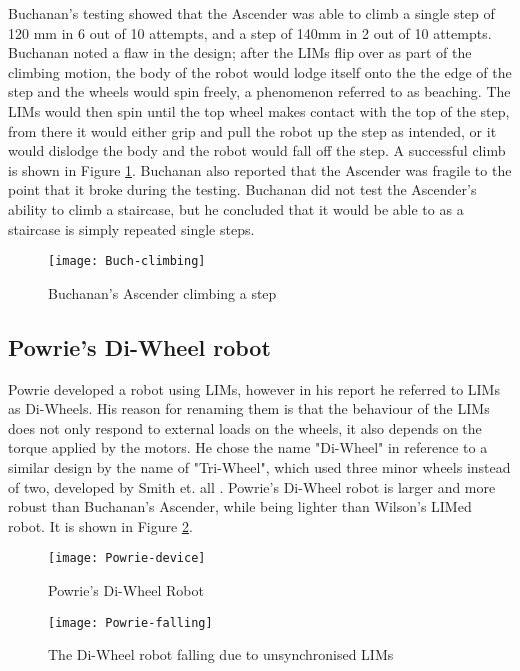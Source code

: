 Buchanan's testing showed that the Ascender was able to climb a single step of 120 mm in 6 out of 10 attempts, and a step of 140mm in 2 out of 10 attempts. Buchanan noted a flaw in the design; after the LIMs flip over as part of the climbing motion, the body of the robot would lodge itself onto the the edge of the step and the wheels would spin freely, a phenomenon referred to as beaching. The LIMs would then spin until the top wheel makes contact with the top of the step, from there it would either grip and pull the robot up the step as intended, or it would dislodge the body and the robot would fall off the step. A successful climb is shown in Figure \ref{Buch climbing}.  Buchanan also reported that the Ascender was fragile to the point that it broke during the testing. Buchanan did not test the Ascender's ability to climb a staircase, but he concluded that it would be able to as a staircase is simply repeated single steps.
\newpage
\begin{figure}[h]
	\centering
	\texttt{[image: Buch-climbing]}
	\caption{Buchanan's Ascender climbing a step \citep{Buchanan-2018}}
	\label{Buch climbing}
\end{figure}

\newpage
\subsection{Powrie's Di-Wheel robot}

Powrie developed a robot using LIMs, however in his report he referred to LIMs as Di-Wheels. His reason for renaming them is that the behaviour of the LIMs does not only respond to external loads on the wheels, it also depends on the torque applied by the motors. He chose the name "Di-Wheel" in reference to a similar design by the name of "Tri-Wheel", which used three minor wheels instead of two, developed by Smith et. all \citep{Smith-2015}. Powrie's Di-Wheel robot is larger and more robust than Buchanan's Ascender, while being lighter than Wilson's LIMed robot. It is shown in Figure \ref{Powrie robot}.\\

\begin{figure}[h]
	\centering
	\texttt{[image: Powrie-device]}
	\caption{Powrie's Di-Wheel Robot \citep{Powrie-2019}}
	\label{Powrie robot}
\end{figure}

\begin{wrapfigure}{r}{0.35\textwidth} %
	\centering
	\texttt{[image: Powrie-falling]}
	\caption{The Di-Wheel robot falling due to unsynchronised LIMs \citep{Powrie-2019}}
	\label{Powrie falling}
\end{wrapfigure}



